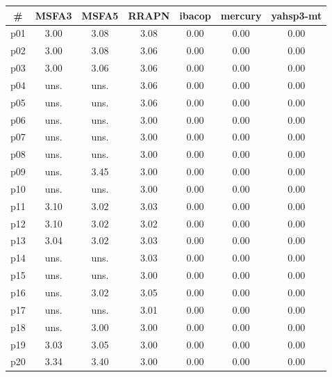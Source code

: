\begin{tabular}{c||c|c|c|c|c|c}
\textbf{\#} & \textbf{MSFA3} & \textbf{MSFA5} & \textbf{RRAPN} & \textbf{ibacop} & \textbf{mercury} & \textbf{yahsp3-mt}\\
\hline
\hline
p01 & 3.00 & 3.08 & 3.08 & 0.00 & 0.00 & 0.00\\
p02 & 3.00 & 3.08 & 3.06 & 0.00 & 0.00 & 0.00\\
p03 & 3.00 & 3.06 & 3.06 & 0.00 & 0.00 & 0.00\\
p04 & uns. & uns. & 3.06 & 0.00 & 0.00 & 0.00\\
p05 & uns. & uns. & 3.06 & 0.00 & 0.00 & 0.00\\
p06 & uns. & uns. & 3.00 & 0.00 & 0.00 & 0.00\\
p07 & uns. & uns. & 3.00 & 0.00 & 0.00 & 0.00\\
p08 & uns. & uns. & 3.00 & 0.00 & 0.00 & 0.00\\
p09 & uns. & 3.45 & 3.00 & 0.00 & 0.00 & 0.00\\
p10 & uns. & uns. & 3.00 & 0.00 & 0.00 & 0.00\\
p11 & 3.10 & 3.02 & 3.03 & 0.00 & 0.00 & 0.00\\
p12 & 3.10 & 3.02 & 3.02 & 0.00 & 0.00 & 0.00\\
p13 & 3.04 & 3.02 & 3.03 & 0.00 & 0.00 & 0.00\\
p14 & uns. & uns. & 3.03 & 0.00 & 0.00 & 0.00\\
p15 & uns. & uns. & 3.00 & 0.00 & 0.00 & 0.00\\
p16 & uns. & 3.02 & 3.05 & 0.00 & 0.00 & 0.00\\
p17 & uns. & uns. & 3.01 & 0.00 & 0.00 & 0.00\\
p18 & uns. & 3.00 & 3.00 & 0.00 & 0.00 & 0.00\\
p19 & 3.03 & 3.05 & 3.00 & 0.00 & 0.00 & 0.00\\
p20 & 3.34 & 3.40 & 3.00 & 0.00 & 0.00 & 0.00\\
\end{tabular}

